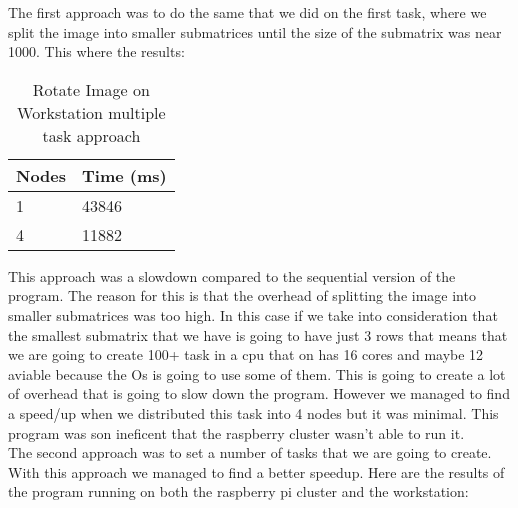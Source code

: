 \documentclass[12pt]{article}
\begin{document}
The first approach was to do the same that we did on the first task, where we split the image into smaller submatrices until the size of the submatrix was near 1000. This where the results:

\begin{table}[H]
  \caption{Rotate Image on Workstation multiple task approach}\label{tab:rotate-image}
  \begin{center}
    \begin{tabular}[c]{l|l}
      \textbf{Nodes} & \textbf{Time (ms)} \\
      \hline
      1 & 43846 \\
      4 & 11882\\
    \end{tabular}
  \end{center}
\end{table}

This approach was a slowdown compared to the sequential version of the program. The reason for this is that the overhead of splitting the image into smaller submatrices was too high. In this case if we take into consideration that the smallest submatrix that we have is going to have just 3 rows that means that we are going to create 100+ task in a cpu that on has 16 cores and maybe 12 aviable because the Os is going to use some of them. This is going to create a lot of overhead that is going to slow down the program. However we managed to find a speed/up when we distributed this task into 4 nodes but it was minimal. This program was son ineficent that the raspberry cluster wasn't able to run it. \\

The second approach was to set a number of tasks that we are going to create. With this approach we managed to find a better speedup. Here are the results of the program running on both the raspberry pi cluster and the workstation:
\end{document}
